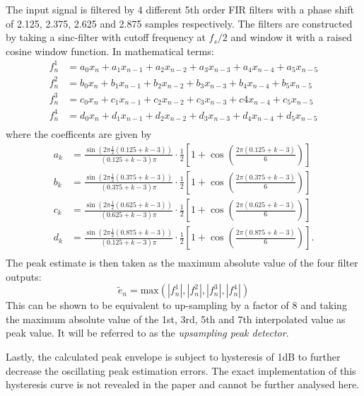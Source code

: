 \documentclass[../main2.tex]{subfiles}
\begin{document}
The input signal is filtered by 4 different 5th order FIR filters with a phase shift of 2.125, 2.375, 2.625 and 2.875 samples respectively. The filters are constructed by taking a sinc-filter with cutoff frequency at $f_s/2$ and window it with a raised cosine window function. In mathematical terms:
\begin{equation}
\begin{split}
f^1_n &= a_0 x_{n} + a_1 x_{n-1} + a_2 x_{n-2} + a_3 x_{n-3} + a_4 x_{n-4} + a_5 x_{n-5} \\
f^2_n &= b_0 x_{n} + b_1 x_{n-1} + b_2 x_{n-2} + b_3 x_{n-3} + b_4 x_{n-4} + b_5 x_{n-5} \\
f^3_n &= c_0 x_{n} + c_1 x_{n-1} + c_2 x_{n-2} + c_3 x_{n-3} + c4 x_{n-4} + c_5 x_{n-5} \\
f^4_n &= d_0 x_{n} + d_1 x_{n-1} + d_2 x_{n-2} + d_3 x_{n-3} + d_4 x_{n-4} + d_5 x_{n-5} \\
\end{split}
\end{equation}
where the coefficents are given by
\begin{equation}
\begin{split}
a_k &= \frac{\sin (2 \pi \frac{1}{2} (0.125+k-3) )}{(0.125+k-3)\pi} \cdot \frac{1}{2}\left[1+\cos \left(\frac{2 \pi (0.125+k-3)}{6} \right) \right] \\
b_k &= \frac{\sin (2 \pi \frac{1}{2} (0.375+k-3) )}{(0.375+k-3)\pi} \cdot \frac{1}{2}\left[1+\cos \left(\frac{2 \pi (0.375+k-3)}{6} \right) \right] \\
c_k &= \frac{\sin (2 \pi \frac{1}{2} (0.625+k-3) )}{(0.625+k-3)\pi} \cdot \frac{1}{2}\left[1+\cos \left(\frac{2 \pi (0.625+k-3)}{6} \right) \right] \\
d_k &= \frac{\sin (2 \pi \frac{1}{2} (0.875+k-3) )}{(0.125+k-3)\pi} \cdot \frac{1}{2}\left[1+\cos \left(\frac{2 \pi (0.875+k-3)}{6} \right) \right]. \\
\end{split}
\end{equation}
The peak estimate is then taken as the maximum absolute value of the four filter outputs:
\begin{equation}
\tilde{e}_n = \text{max}(|f^1_n|, |f^2_n|, |f^3_n|, |f^4_n|)
\end{equation}
This can be shown to be equivalent to up-sampling by a factor of 8 and taking the maximum absolute value of the 1st, 3rd, 5th and 7th interpolated value as peak value. It will be referred to as the \emph{upsampling peak detector}.

Lastly, the calculated peak envelope is subject to hysteresis of 1dB to further decrease the oscillating peak estimation errors. The exact implementation of this hysteresis curve is not revealed in the paper and cannot be further analysed here.
\end{document}
